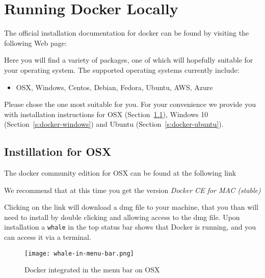 
\chapter{Running Docker Locally}
\label{S:docker-local}

\FILENAME

The official installation documentation for docker can be found by
visiting the following Web page:


Here you will find a variety of packages, one of which will hopefully
suitable for your operating system. The supported operating systems
currently include:

\begin{itemize}
\item  OSX, Windows, Centos, Debian, Fedora, Ubuntu, AWS, Azure
\end{itemize}

Please chose the one most suitable for you. For your convenience we
provide you with installation instructions for OSX
(Section~\ref{s:docker-osx}), Windows 10 (Section~\ref{s:docker-windows})
and Ubuntu (Section~\ref{s:docker-ubuntu}).

\section{Instillation for OSX}
\label{s:docker-osx}

The docker community edition for OSX can be found at the following link


We recommend that at this time you get the version \textit{Docker CE for MAC (stable)}


Clicking on the link will download a dmg file to your machine, that
you than will need to install by double clicking and allowing access
to the dmg file. Upon installation a \texttt{whale} in the top status
bar shows that Docker is running, and you can access it via a terminal.

\begin{figure}[htb]
\centering
\texttt{[image: whale-in-menu-bar.png]}
\caption{Docker integrated in the menu bar on OSX}
\end{figure}

